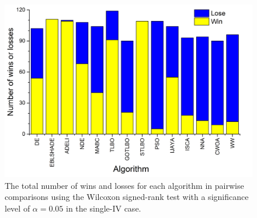 \documentclass[a4paper,fleqn]{cas-dc}
\begin{document}
\begin{figure}[]
	\centering
		\includegraphics[width=1.0\columnwidth]{Fig5}
	  \caption{The total number of wins and losses for each algorithm in pairwise comparisons using the
               Wilcoxon signed-rank test with a significance level of $\alpha = 0.05$ in the single-IV case.}\label{figWilTotSingleIV}
\end{figure}
\end{document}
